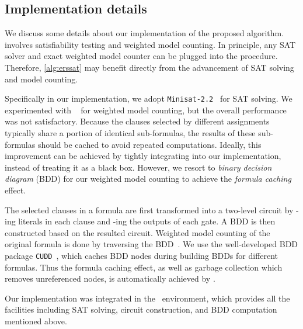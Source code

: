 
\subsection{Implementation details}
We discuss some details about our implementation of the proposed algorithm.
 involves satisfiability testing and weighted model counting.
In principle, any SAT solver and exact weighted model counter can be plugged into the procedure.
Therefore, \cref{alg:erssat} may benefit directly from the advancement of SAT solving and model counting.

Specifically in our implementation,
we adopt \texttt{Minisat-2.2}~\cite{Een2003Solver} for SAT solving.
We experimented with \cachet~\cite{Sang2004,Sang2005ModelCounting} for weighted model counting,
but the overall performance was not satisfactory.
Because the clauses selected by different assignments typically share a portion of identical sub-formulas,
the results of these sub-formulas should be cached to avoid repeated computations.
Ideally, this improvement can be achieved by tightly integrating \cachet into our implementation,
instead of treating it as a black box.
However, we resort to \textit{binary decision diagram} (BDD) for our weighted model counting to achieve the \textit{formula caching} effect.

The selected clauses in a formula are first transformed into a two-level circuit by \disjoin-ing literals in each clause and \conjoin-ing the outputs of each \disjoin gate.
A BDD is then constructed based on the resulted circuit.
Weighted model counting of the original formula is done by traversing the BDD~\cite{LeeTC18ProbDesign}.
We use the well-developed BDD package \texttt{CUDD}~\cite{CUDD},
which caches BDD nodes during building BDDs for different formulas.
Thus the formula caching effect,
as well as garbage collection which removes unreferenced nodes,
is automatically achieved by \cudd.

Our implementation was integrated in the \abc~\cite{ABC}environment,
which provides all the facilities including SAT solving, circuit construction, and BDD computation mentioned above.